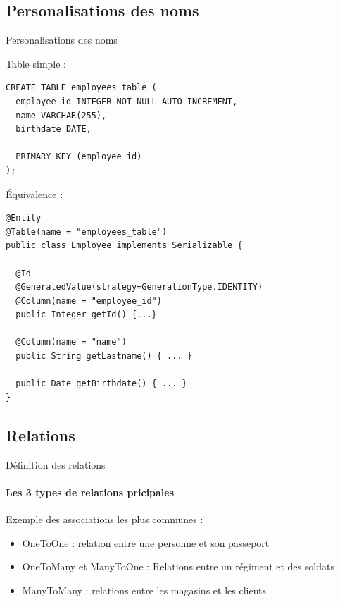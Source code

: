\documentclass[compact]{beamer}%
\begin{document}
\subsection{Personalisations des noms}
\begin{frame}[fragile]{Personalisations des noms}

	
	Table simple : 
	\begin{lstlisting}
CREATE TABLE employees_table (
  employee_id INTEGER NOT NULL AUTO_INCREMENT,
  name VARCHAR(255),
  birthdate DATE,
  
  PRIMARY KEY (employee_id)
);
	\end{lstlisting}
	
	\pause
	\'Equivalence :
	\begin{lstlisting}
@Entity
@Table(name = "employees_table")
public class Employee implements Serializable {

  @Id
  @GeneratedValue(strategy=GenerationType.IDENTITY)
  @Column(name = "employee_id")
  public Integer getId() {...}
    
  @Column(name = "name")
  public String getLastname() { ... }
  
  public Date getBirthdate() { ... }
}
	\end{lstlisting}
	
\end{frame}


\subsection{Relations}

\begin{frame}{Définition des relations}
	\framesubtitle{Les 3 types de relations pricipales}
	
	Exemple des associations les plus communes :
	\begin{itemize}[<+->]
		\item OneToOne : relation entre une personne et son passeport
		\item OneToMany et ManyToOne : Relations entre un régiment et des soldats
		\item ManyToMany : relations entre les magasins et les clients
	\end{itemize}

\end{frame}
\end{document}
